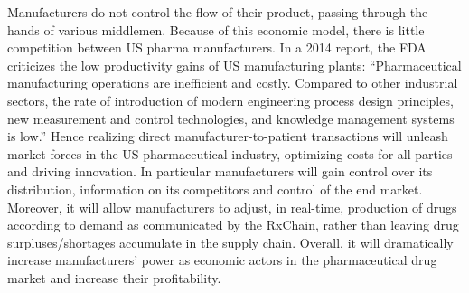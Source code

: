 Manufacturers do not control the flow of their product, passing
through the hands of various middlemen.
Because of this economic model, there is little competition between US pharma manufacturers.
In a 2014 report, the FDA criticizes the low productivity gains of US manufacturing plants: “Pharmaceutical manufacturing operations are inefficient and costly. Compared to other industrial sectors, the rate of introduction of modern engineering process design principles, new measurement and control technologies, and knowledge management systems is low.” 
Hence realizing direct manufacturer-to-patient transactions will unleash market forces in the US pharmaceutical industry, optimizing costs for all parties and driving innovation.
In particular manufacturers will gain control over its distribution,
information on its competitors and control of the end
market. Moreover, it will allow manufacturers to adjust, in real-time,
production of drugs according to demand as communicated by the
RxChain, rather than leaving drug surpluses/shortages accumulate in
the supply chain.
Overall, it will dramatically increase manufacturers’ power as
economic actors in the pharmaceutical drug market and increase their profitability.
